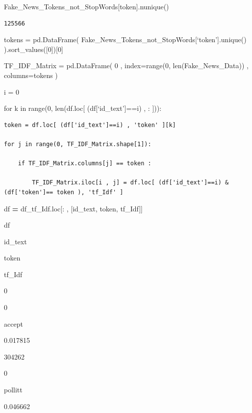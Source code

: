 \documentclass[
  11pt,
  a4paper,
]{article}
\newenvironment{Shaded}{\begin{snugshade}}{\end{snugshade}}
\newcommand{\NormalTok}[1]{#1}
\newcommand{\OperatorTok}[1]{\textcolor[rgb]{0.81,0.36,0.00}{\textbf{#1}}}
\newcommand{\StringTok}[1]{\textcolor[rgb]{0.31,0.60,0.02}{#1}}
\begin{document}
\begin{Shaded}
\begin{Highlighting}[]
\NormalTok{Fake\_News\_Tokens\_not\_StopWords[}\StringTok{\textquotesingle{}token\textquotesingle{}}\NormalTok{].nunique()}
\end{Highlighting}
\end{Shaded}

\begin{verbatim}
125566
\end{verbatim}

tokens = pd.DataFrame(
Fake\_News\_Tokens\_not\_StopWords{[}`token'{]}.unique()
).sort\_values({[}0{]}){[}0{]}

TF\_IDF\_Matrix = pd.DataFrame( 0 , index=range(0,
len(Fake\_News\_Data)) , columns=tokens )

i = 0

for k in range(0, len(df.loc{[} (df{[}`id\_text'{]}==i) , : {]})):

\begin{verbatim}
token = df.loc[ (df['id_text']==i) , 'token' ][k]

for j in range(0, TF_IDF_Matrix.shape[1]):

    if TF_IDF_Matrix.columns[j] == token :

        TF_IDF_Matrix.iloc[i , j] = df.loc[ (df['id_text']==i) & (df['token']== token ), 'tf_Idf' ]
\end{verbatim}

\begin{Shaded}
\begin{Highlighting}[]
\NormalTok{df }\OperatorTok{=}\NormalTok{ df\_tf\_Idf.loc[: , [}\StringTok{\textquotesingle{}id\_text\textquotesingle{}}\NormalTok{, }\StringTok{\textquotesingle{}token\textquotesingle{}}\NormalTok{, }\StringTok{\textquotesingle{}tf\_Idf\textquotesingle{}}\NormalTok{]]}

\NormalTok{df}
\end{Highlighting}
\end{Shaded}

id\_text

token

tf\_Idf

0

0

accept

0.017815

304262

0

pollitt

0.046662
\end{document}
